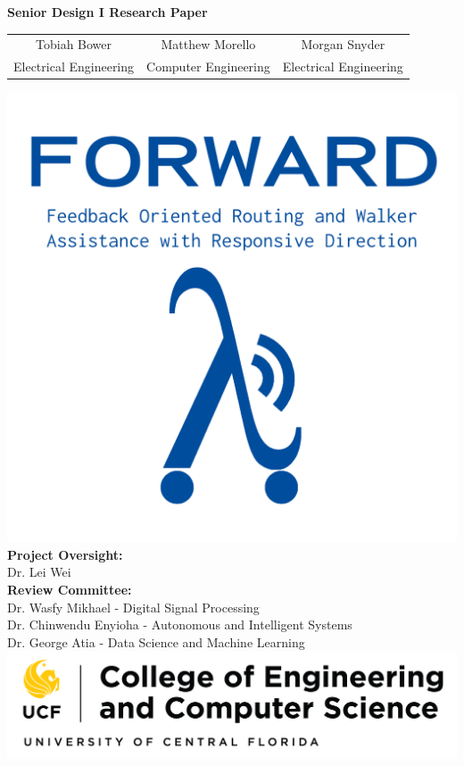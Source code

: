 \begin{titlepage}
	
\thispagestyle{empty}

\begin{center}
	\textbf{\Huge Senior Design I Research Paper} \\[\baselineskip]
	
	\begin{tabular}{c c c}
		{\large Tobiah Bower} & {\large Matthew Morello} & {\large Morgan Snyder} \\ 
		\small Electrical Engineering & \small Computer Engineering & \small Electrical Engineering
	\end{tabular}
\end{center}
\begin{center}
	\includegraphics[width=.9\textwidth]{./Images/FORWARD_logo_type_blue.png}\\
	\noindent \textbf{Project Oversight:}\\
	Dr. Lei Wei\\
	
	\noindent \textbf{Review Committee:}\\
	Dr. Wasfy Mikhael - Digital Signal Processing\\
	Dr. Chinwendu Enyioha - Autonomous and Intelligent Systems\\
	Dr. George Atia - Data Science and Machine Learning\\
	\vspace{1\baselineskip} %
	\includegraphics[scale=0.4]{./Images/ucfece.png} %
\end{center}
	
\end{titlepage}